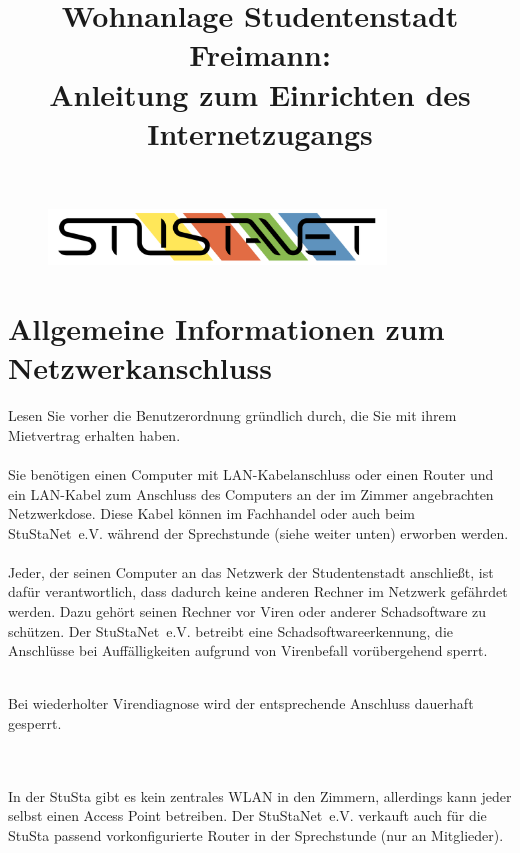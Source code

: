 \documentclass[a4paper,12pt]{scrartcl}
\title{Wohnanlage Studentenstadt Freimann:\\
       Anleitung zum Einrichten des Internetzugangs}
\begin{document}
\maketitle

\begin{figure}[t!]
   \centering
   \vspace{-20pt}
   \includegraphics[width=0.8\textwidth,keepaspectratio]{Bilder/StuStaNet_Logo}
   \vspace{-40pt}
\end{figure}

\section{Allgemeine Informationen zum Netzwerkanschluss}

Lesen Sie vorher die Benutzerordnung gründlich durch, die Sie mit ihrem Mietvertrag erhalten haben.
\\
\\
Sie benötigen einen Computer mit LAN-Kabelanschluss oder einen Router und ein LAN-Kabel zum Anschluss des Computers an der im Zimmer angebrachten Netzwerkdose. Diese Kabel können im Fachhandel oder auch beim StuStaNet~e.V. während der Sprechstunde (siehe weiter unten) erworben werden.
\\
\\
Jeder, der seinen Computer an das Netzwerk der Studentenstadt anschließt, ist dafür verantwortlich, dass dadurch keine anderen Rechner im Netzwerk gefährdet werden. Dazu gehört seinen Rechner vor Viren oder anderer Schadsoftware zu schützen.
Der StuStaNet~e.V. betreibt eine Schadsoftwareerkennung, die Anschlüsse bei Auffälligkeiten aufgrund von Virenbefall vorübergehend sperrt.
\begin{bfseries}
	\\Bei wiederholter Virendiagnose wird der entsprechende Anschluss dauerhaft gesperrt.
\end{bfseries}
\\
\\
In der StuSta gibt es kein zentrales WLAN in den Zimmern, allerdings kann jeder selbst einen Access Point betreiben. Der StuStaNet~e.V. verkauft auch für die StuSta passend vorkonfigurierte Router in der Sprechstunde (nur an Mitglieder).
\end{document}

